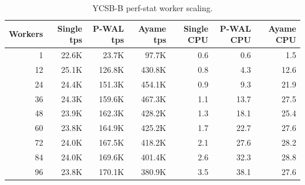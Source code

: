 \begin{table}[t]
  \centering
  \caption{YCSB-B perf-stat worker scaling.}
  \label{tab:ycsbb-perf-scaling}
  \small
  \setlength{\tabcolsep}{6pt}
  \begin{tabular}{rrrrrrr}
    \hline
    Workers & Single tps & P-WAL tps & Ayame tps & Single CPU & P-WAL CPU & Ayame CPU \\
    \hline
    1 & 22.6K & 23.7K & 97.7K & 0.6 & 0.6 & 1.5 \\
    12 & 25.1K & 126.8K & 430.8K & 0.8 & 4.3 & 12.6 \\
    24 & 24.4K & 151.3K & 454.1K & 0.9 & 9.3 & 21.9 \\
    36 & 24.3K & 159.6K & 467.3K & 1.1 & 13.7 & 27.5 \\
    48 & 23.9K & 162.3K & 428.2K & 1.3 & 18.1 & 25.4 \\
    60 & 23.8K & 164.9K & 425.2K & 1.7 & 22.7 & 27.6 \\
    72 & 24.0K & 167.5K & 418.2K & 2.1 & 27.6 & 28.2 \\
    84 & 24.0K & 169.6K & 401.4K & 2.6 & 32.3 & 28.8 \\
    96 & 23.8K & 170.1K & 380.9K & 3.5 & 38.1 & 27.6 \\
    \hline
  \end{tabular}
\end{table}
